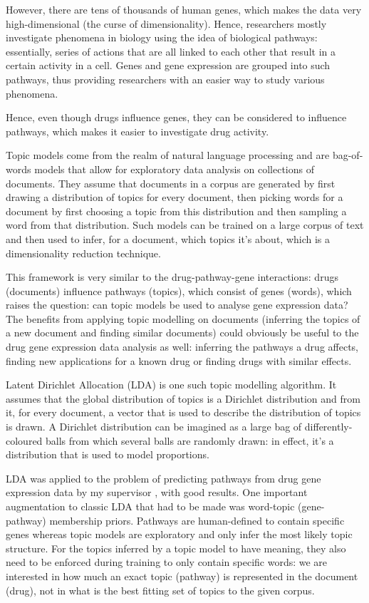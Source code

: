 \documentclass[12pt,a4paper,twoside,openright]{report}
\begin{document}
However, there are tens of thousands of human genes, which makes the data very high-dimensional (the curse of dimensionality). Hence, researchers mostly investigate phenomena in biology using the idea of biological pathways: essentially, series of actions that are all linked to each other that result in a certain activity in a cell. Genes and gene expression are grouped into such pathways, thus providing researchers with an easier way to study various phenomena.

Hence, even though drugs influence genes, they can be considered to influence pathways, which makes it easier to investigate drug activity.

Topic models come from the realm of natural language processing and are bag-of-words models that allow for exploratory data analysis on collections of documents. They assume that documents in a corpus are generated by first drawing a distribution of topics for every document, then picking words for a document by first choosing a topic from this distribution and then sampling a word from that distribution. Such models can be trained on a large corpus of text and then used to infer, for a document, which topics it's about, which is a dimensionality reduction technique.

This framework is very similar to the drug-pathway-gene interactions: drugs (documents) influence pathways (topics), which consist of genes (words), which raises the question: can topic models be used to analyse gene expression data? The benefits from applying topic modelling on documents (inferring the topics of a new document and finding similar documents) could obviously be useful to the drug gene expression data analysis as well: inferring the pathways a drug affects, finding new applications for a known drug or finding drugs with similar effects.

Latent Dirichlet Allocation (LDA) \cite{Blei} is one such topic modelling algorithm. It assumes that the global distribution of topics is a Dirichlet distribution and from it, for every document, a vector that is used to describe the distribution of topics is drawn. A Dirichlet distribution can be imagined as a large bag of differently-coloured balls from which several balls are randomly drawn: in effect, it's a distribution that is used to model proportions.

LDA was applied to the problem of predicting pathways from drug gene expression data by my supervisor \cite{Pratanwanich2014}, with good results. One important augmentation to classic LDA that had to be made was word-topic (gene-pathway) membership priors. Pathways are human-defined to contain specific genes whereas topic models are exploratory and only infer the most likely topic structure. For the topics inferred by a topic model to have meaning, they also need to be enforced during training to only contain specific words: we are interested in how much an exact topic (pathway) is represented in the document (drug), not in what is the best fitting set of topics to the given corpus.
\end{document}
